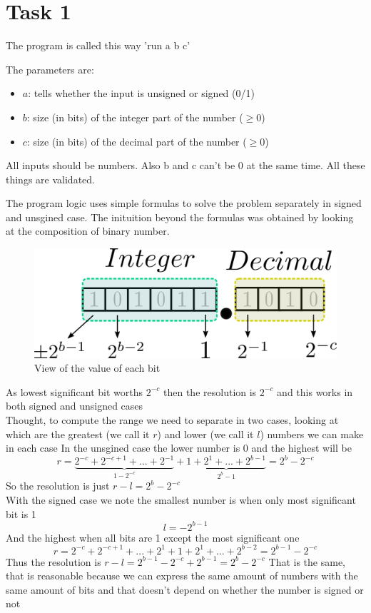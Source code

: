 \newpage

\section*{Task 1}

The program is called this way 'run a b c'

The parameters are:
\begin{itemize}
  \item $a$: tells whether the input is unsigned or signed (0/1)
  \item $b$: size (in bits) of the integer part of the number ($\geq0$)
  \item $c$: size (in bits) of the decimal part of the number ($\geq0$)
\end{itemize}
All inputs should be numbers. Also b and c can't be 0 at the same time.
All these things are validated.

The program logic uses simple formulas to solve the problem separately in signed and unsgined case.
The inituition beyond the formulas was obtained by looking at the composition of binary number.
\begin{figure}[H]
  \begin{centering}
  \includegraphics[scale=1]{data/bits.png}
  \par\end{centering}
  \caption{View of the value of each bit}
\end{figure}
As lowest significant bit worths $2^{-c}$ then the resolution is $2^{-c}$ and this works in both signed and unsigned cases
\\
Thought, to compute the range we need to separate in two cases, looking at which are the greatest (we call it $r$) and lower (we call it $l$) numbers we can make in each case
In the unsgined case the lower number is 0 and the highest will be
$$r=\underbrace{2^{-c}+2^{-c+1}+...+2^{-1}}_{1-2^{-c}}+\underbrace{1+2^{1}+...+2^{b-1}}_{2^{b}-1}=2^{b}-2^{-c}$$
So the resolution is just $r-l=2^{b}-2^{-c}$
\\
With the signed case we note the smallest number is when only most significant bit is 1
$$l=-2^{b-1} $$
And the highest when all bits are 1 except the most significant one
$$r=2^{-c}+2^{-c+1}+...+2^{1}+1+2^{1}+...+2^{b-2}=2^{b-1}-2^{-c}$$
Thus the resolution is $r-l=2^{b-1}-2^{-c}+2^{b-1}=2^{b}-2^{-c}$
That is the same, that is reasonable because we can express the same amount of numbers with the same amount of bits and that doesn't depend on whether the number is signed or not

